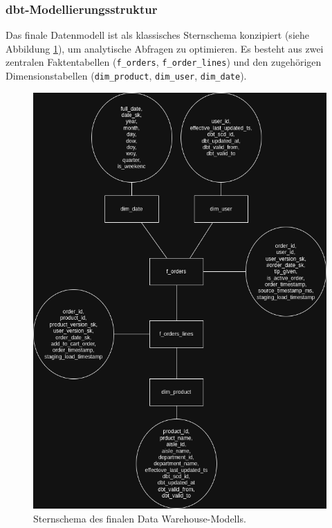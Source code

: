 \documentclass[
    12pt,               
    a4paper,        
    ngerman            
]{scrartcl}
\begin{document}
\subsubsection{dbt-Modellierungsstruktur}
\label{sssec:dbt_modellierung}
Das finale Datenmodell ist als klassisches Sternschema konzipiert (siehe Abbildung \ref{fig:dwh_schema}), um analytische Abfragen zu optimieren. Es besteht aus zwei zentralen Faktentabellen (\texttt{f\_orders}, \texttt{f\_order\_lines}) und den zugehörigen Dimensionstabellen (\texttt{dim\_product}, \texttt{dim\_user}, \texttt{dim\_date}).

\begin{figure}[h!]
    \centering
    \includegraphics[width=\textwidth]{DWH_diagramm.png} %
    \caption{Sternschema des finalen Data Warehouse-Modells.}
    \label{fig:dwh_schema}
\end{figure}
\end{document}
